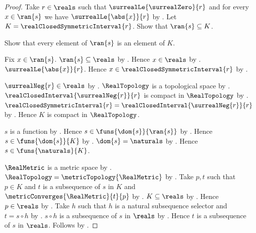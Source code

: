 \begin{proof}
    Take $r\in\reals$ such that $\surrealLe{\surrealZero}{r}$ and
        for every $x\in\ran{s}$ we have $\surrealLe{\abs{x}}{r}$ by
        .
    Let $K=\realClosedSymmetricInterval{r}$.
    Show that $\ran{s}\subseteq K$.
    \begin{subproof}
        Show that every element of $\ran{s}$ is an element of $K$.
        \begin{subproof}
            Fix $x\in\ran{s}$.
            $\ran{s}\subseteq\reals$ by .
            Hence $x\in\reals$ by .
            $\surrealLe{\abs{x}}{r}$.
            Hence $x\in\realClosedSymmetricInterval{r}$ by
                .
        \end{subproof}
    \end{subproof}

    $\surrealNeg{r}\in\reals$ by
        .
    $\RealTopology$ is a topological space by
        .
    $\realClosedInterval{\surrealNeg{r}}{r}$ is compact in
        $\RealTopology$ by .
    $\realClosedSymmetricInterval{r}
        =\realClosedInterval{\surrealNeg{r}}{r}$ by
        .
    Hence $K$ is compact in $\RealTopology$.

    $s$ is a function by .
    Hence $s\in\funs{\dom{s}}{\ran{s}}$ by
        .
    Hence $s\in\funs{\dom{s}}{K}$ by
        .
    $\dom{s}=\naturals$ by .
    Hence $s\in\funs{\naturals}{K}$.

    $\RealMetric$ is a metric space by
        .
    $\RealTopology=\metricTopology{\RealMetric}$ by
        .
    Take $p,t$ such that $p\in K$ and
        $t$ is a subsequence of $s$ in $K$ and
        $\metricConverges{\RealMetric}{t}{p}$ by
        .
    $K\subseteq\reals$ by
        .
    Hence $p\in\reals$ by .
    Take $h$ such that $h$ is a natural subsequence selector and
        $t=s\circ h$ by .
    $s\circ h$ is a subsequence of $s$ in $\reals$ by
        .
    Hence $t$ is a subsequence of $s$ in $\reals$.
    Follows by \auto.
\end{proof}
